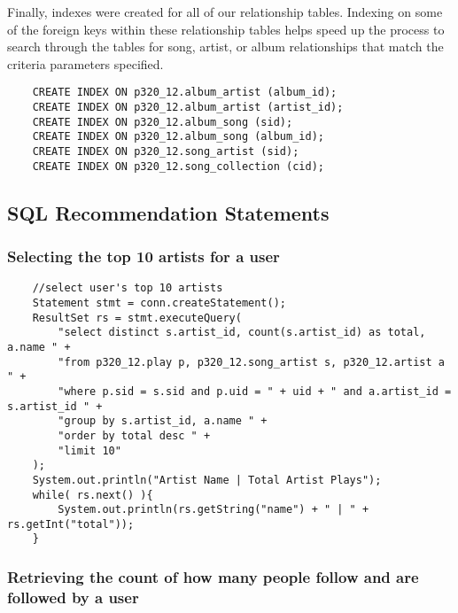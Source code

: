 \documentclass[12pt]{article}
\begin{document}
    \noindent Finally, indexes were created for all of our relationship tables.
    Indexing on some of the foreign keys within these relationship tables
    helps speed up the process to search through the tables for song, artist,
    or album relationships that match the criteria parameters specified.
    \begin{lstlisting}
    CREATE INDEX ON p320_12.album_artist (album_id);
    CREATE INDEX ON p320_12.album_artist (artist_id);
    CREATE INDEX ON p320_12.album_song (sid);
    CREATE INDEX ON p320_12.album_song (album_id);
    CREATE INDEX ON p320_12.song_artist (sid);
    CREATE INDEX ON p320_12.song_collection (cid);
    \end{lstlisting}

    
    \subsection{SQL Recommendation Statements}
    
    \subsubsection{Selecting the top 10 artists for a user}
    \begin{lstlisting}
    //select user's top 10 artists
    Statement stmt = conn.createStatement();
    ResultSet rs = stmt.executeQuery(
        "select distinct s.artist_id, count(s.artist_id) as total, a.name " +
        "from p320_12.play p, p320_12.song_artist s, p320_12.artist a " +
        "where p.sid = s.sid and p.uid = " + uid + " and a.artist_id = s.artist_id " +
        "group by s.artist_id, a.name " +
        "order by total desc " +
        "limit 10"
    );
    System.out.println("Artist Name | Total Artist Plays");
    while( rs.next() ){
        System.out.println(rs.getString("name") + " | " + rs.getInt("total"));
    }
    \end{lstlisting}

    \subsubsection{Retrieving the count of how many people follow and are followed by a user}
\end{document}
